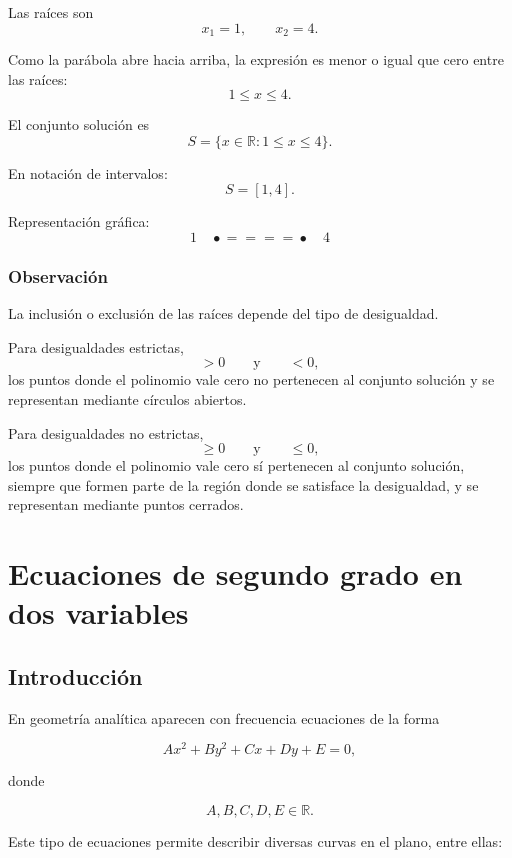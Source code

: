 \documentclass[12pt]{article}
\begin{document}
{\begin{enumerate}
Las raíces son
\[
x_1=1,
\qquad
x_2=4.
\]

Como la parábola abre hacia arriba, la expresión es menor o igual que
cero entre las raíces:
\[
1\leq x\leq4.
\]

El conjunto solución es
\[
\boxed{
S=
\{x\in\mathbb{R}:1\leq x\leq4\}.
}
\]

En notación de intervalos:
\[
\boxed{
S=[1,4].
}
\]

Representación gráfica:
\[
1\quad
\bullet\!\!=\!\!=\!\!=\!\!=\!\bullet
\quad4
\]

\end{enumerate}

\subsubsection*{Observación}

La inclusión o exclusión de las raíces depende del tipo de desigualdad.

Para desigualdades estrictas,
\[
>0
\qquad\text{y}\qquad
<0,
\]
los puntos donde el polinomio vale cero no pertenecen al conjunto
solución y se representan mediante círculos abiertos.

Para desigualdades no estrictas,
\[
\geq0
\qquad\text{y}\qquad
\leq0,
\]
los puntos donde el polinomio vale cero sí pertenecen al conjunto
solución, siempre que formen parte de la región donde se satisface la
desigualdad, y se representan mediante puntos cerrados.

\section{Ecuaciones de segundo grado en dos variables}

\subsection{Introducción}

En geometría analítica aparecen con frecuencia ecuaciones de la forma

\[
Ax^2+By^2+Cx+Dy+E=0,
\]

donde

\[
A,B,C,D,E\in\mathbb{R}.
\]

Este tipo de ecuaciones permite describir diversas curvas en el plano,
entre ellas:

}
\end{document}
